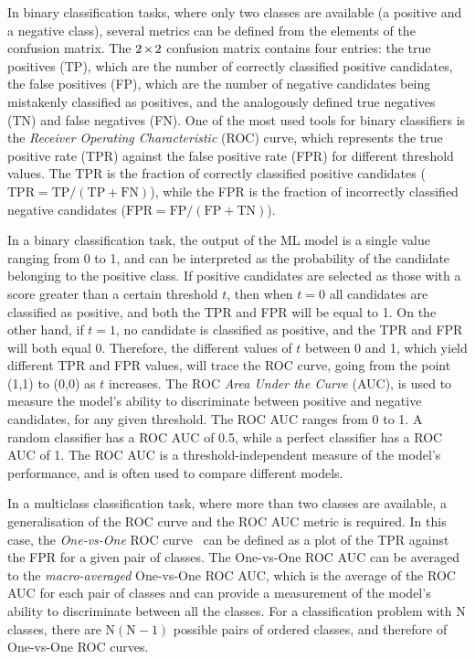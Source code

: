 In binary classification tasks, where only two classes are available (a positive and a negative class), several metrics can be defined from the elements of the confusion matrix. The $2\mkern-2mu\times\mkern-2mu2$ confusion matrix contains four entries: the true positives (TP), which are the number of correctly classified positive candidates, the false positives (FP), which are the number of negative candidates being mistakenly classified as positives, and the analogously defined true negatives (TN) and false negatives (FN). One of the most used tools for binary classifiers is the \emph{Receiver Operating Characteristic} (ROC) curve, which represents the true positive rate (TPR) against the false positive rate (FPR) for different threshold values. The TPR is the fraction of correctly classified positive candidates ($\mathrm{TPR = TP/(TP+FN)}$), while the FPR is the fraction of incorrectly classified negative candidates ($\mathrm{FPR = FP/(FP+TN)}$). 

In a binary classification task, the output of the ML model is a single value ranging from 0 to 1, and can be interpreted as the probability of the candidate belonging to the positive class. If positive candidates are selected as those with a score greater than a certain threshold $t$, then when $t=0$ all candidates are classified as positive, and both the TPR and FPR will be equal to 1. On the other hand, if $t=1$, no candidate is classified as positive, and the TPR and FPR will both equal 0. Therefore, the different values of $t$ between 0 and 1, which yield different TPR and FPR values, will trace the ROC curve, going from the point (1,1) to (0,0) as $t$ increases. The ROC \emph{Area Under the Curve} (AUC), is used to measure the model's ability to discriminate between positive and negative candidates, for any given threshold. The ROC AUC ranges from 0 to 1. A random classifier has a ROC AUC of 0.5, while a perfect classifier has a ROC AUC of 1. The ROC AUC is a threshold-independent measure of the model's performance, and is often used to compare different models. 

In a multiclass classification task, where more than two classes are available, a generalisation of the ROC curve and the ROC AUC metric is required. In this case, the \emph{One-vs-One} ROC curve~\cite{hand2001simple} can be defined as a plot of the TPR against the FPR for a given pair of classes. The One-vs-One ROC AUC can be averaged to the \emph{macro-averaged} One-vs-One ROC AUC, which is the average of the ROC AUC for each pair of classes and can provide a measurement of the model's ability to discriminate between all the classes. For a classification problem with N classes, there are $\mathrm{N(N-1)}$ possible pairs of ordered classes, and therefore of One-vs-One ROC curves. 


